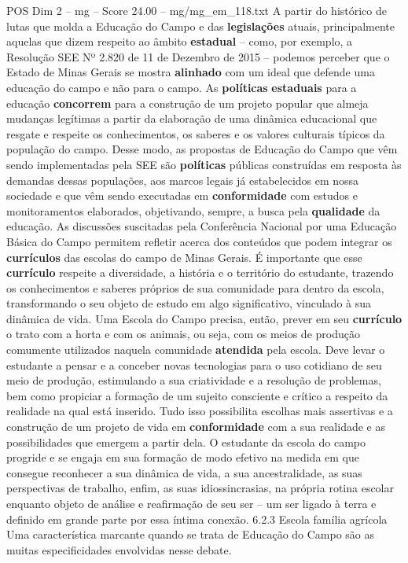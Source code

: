 \begin{textsample}{POS Dim 2 – mg – Score 24.00 – mg/mg\_em\_118.txt}
A partir do histórico de lutas que molda a Educação do Campo e das \textbf{legislações} atuais, principalmente aquelas que dizem respeito ao âmbito \textbf{estadual} – como, por exemplo, a Resolução SEE Nº 2.820 de 11 de Dezembro de 2015 – podemos perceber que o Estado de Minas Gerais se mostra \textbf{alinhado} com um ideal que defende uma educação do campo e não para o campo.
As \textbf{políticas} \textbf{estaduais} para a educação \textbf{concorrem} para a construção de um projeto popular que almeja mudanças legítimas a partir da elaboração de uma dinâmica educacional que resgate e respeite os conhecimentos, os saberes e os valores culturais típicos da população do campo.
Desse modo, as propostas de Educação do Campo que vêm sendo implementadas pela SEE são \textbf{políticas} públicas construídas em resposta às demandas dessas populações, aos marcos legais já estabelecidos em nossa sociedade e que vêm sendo executadas em \textbf{conformidade} com estudos e monitoramentos elaborados, objetivando, sempre, a busca pela \textbf{qualidade} da educação.
As discussões suscitadas pela Conferência Nacional por uma Educação Básica do Campo permitem refletir acerca dos conteúdos que podem integrar os \textbf{currículos} das escolas do campo de Minas Gerais.
É importante que esse \textbf{currículo} respeite a diversidade, a história e o território do estudante, trazendo os conhecimentos e saberes próprios de sua comunidade para dentro da escola, transformando o seu objeto de estudo em algo significativo, vinculado à sua dinâmica de vida.
Uma Escola do Campo precisa, então, prever em seu \textbf{currículo} o trato com a horta e com os animais, ou seja, com os meios de produção comumente utilizados naquela comunidade \textbf{atendida} pela escola.
Deve levar o estudante a pensar e a conceber novas tecnologias para o uso cotidiano de seu meio de produção, estimulando a sua criatividade e a resolução de problemas, bem como propiciar a formação de um sujeito consciente e crítico a respeito da realidade na qual está inserido.
Tudo isso possibilita escolhas mais assertivas e a construção de um projeto de vida em \textbf{conformidade} com a sua realidade e as possibilidades que emergem a partir dela.
O estudante da escola do campo progride e se engaja em sua formação de modo efetivo na medida em que consegue reconhecer a sua dinâmica de vida, a sua ancestralidade, as suas perspectivas de trabalho, enfim, as suas idiossincrasias, na própria rotina escolar enquanto objeto de análise e reafirmação de seu ser – um ser ligado à terra e definido em grande parte por essa íntima conexão. 6.2.3 Escola família agrícola Uma característica marcante quando se trata de Educação do Campo são as muitas especificidades envolvidas nesse debate.

\end{textsample}
